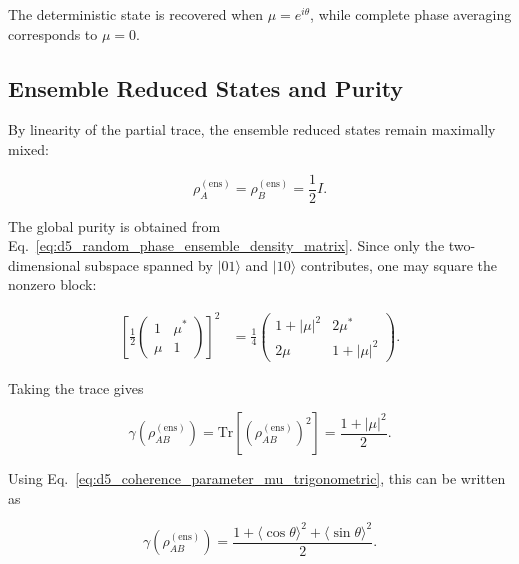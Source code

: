The deterministic state is recovered when \( \mu=e^{i\theta} \), while complete phase averaging corresponds to \( \mu=0 \).


\subsection{Ensemble Reduced States and Purity}

By linearity of the partial trace, the ensemble reduced states remain maximally mixed:

\begin{equation}
\rho_A^{(\mathrm{ens})}
=
\rho_B^{(\mathrm{ens})}
=
\frac{1}{2}I.
\label{eq:d5_random_phase_ensemble_reduced_states}
\end{equation}

The global purity is obtained from Eq.~\eqref{eq:d5_random_phase_ensemble_density_matrix}. Since only the two-dimensional subspace spanned by \( |01\rangle \) and \( |10\rangle \) contributes, one may square the nonzero block:

\begin{align}
\left[
\frac{1}{2}
\begin{pmatrix}
1 & \mu^* \\
\mu & 1
\end{pmatrix}
\right]^2
&=
\frac{1}{4}
\begin{pmatrix}
1+|\mu|^2 & 2\mu^* \\
2\mu & 1+|\mu|^2
\end{pmatrix}.
\label{eq:d5_random_phase_ensemble_block_square}
\end{align}

Taking the trace gives

\begin{equation}
\gamma\left(\rho_{AB}^{(\mathrm{ens})}\right)
=
\mathrm{Tr}\left[
\left(
\rho_{AB}^{(\mathrm{ens})}
\right)^2
\right]
=
\frac{1+|\mu|^2}{2}.
\label{eq:d5_random_phase_ensemble_purity_mu}
\end{equation}

Using Eq.~\eqref{eq:d5_coherence_parameter_mu_trigonometric}, this can be written as

\begin{equation}
\gamma\left(\rho_{AB}^{(\mathrm{ens})}\right)
=
\frac{
1
+
\langle\cos\theta\rangle^2
+
\langle\sin\theta\rangle^2
}{2}.
\label{eq:d5_random_phase_ensemble_purity_trigonometric}
\end{equation}

